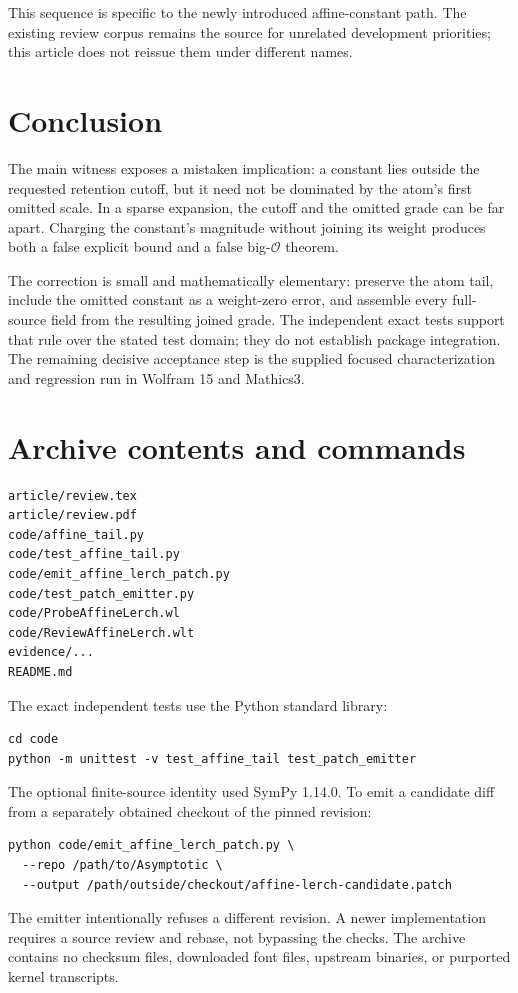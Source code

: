\documentclass[11pt,letterpaper]{article}
\newcommand{\OO}{\mathcal{O}}
\begin{document}
This sequence is specific to the newly introduced affine-constant path. The
existing review corpus remains the source for unrelated development priorities;
this article does not reissue them under different names.

\section{Conclusion}
The main witness exposes a mistaken implication: a constant lies outside the
requested retention cutoff, but it need not be dominated by the atom's first
omitted scale. In a sparse expansion, the cutoff and the omitted grade can be
far apart. Charging the constant's magnitude without joining its weight produces
both a false explicit bound and a false big-$\OO$ theorem.

The correction is small and mathematically elementary: preserve the atom tail,
include the omitted constant as a weight-zero error, and assemble every
full-source field from the resulting joined grade. The independent exact tests
support that rule over the stated test domain; they do not establish package
integration. The remaining decisive acceptance step is the supplied focused
characterization and regression run in Wolfram 15 and Mathics3.

\appendix
\section{Archive contents and commands}
\begin{lstlisting}
article/review.tex
article/review.pdf
code/affine_tail.py
code/test_affine_tail.py
code/emit_affine_lerch_patch.py
code/test_patch_emitter.py
code/ProbeAffineLerch.wl
code/ReviewAffineLerch.wlt
evidence/...
README.md
\end{lstlisting}
The exact independent tests use the Python standard library:
\begin{lstlisting}
cd code
python -m unittest -v test_affine_tail test_patch_emitter
\end{lstlisting}
The optional finite-source identity used SymPy 1.14.0. To emit a candidate diff
from a separately obtained checkout of the pinned revision:
\begin{lstlisting}
python code/emit_affine_lerch_patch.py \
  --repo /path/to/Asymptotic \
  --output /path/outside/checkout/affine-lerch-candidate.patch
\end{lstlisting}
The emitter intentionally refuses a different revision. A newer implementation
requires a source review and rebase, not bypassing the checks. The archive
contains no checksum files, downloaded font files, upstream binaries, or
purported kernel transcripts.
\end{document}
